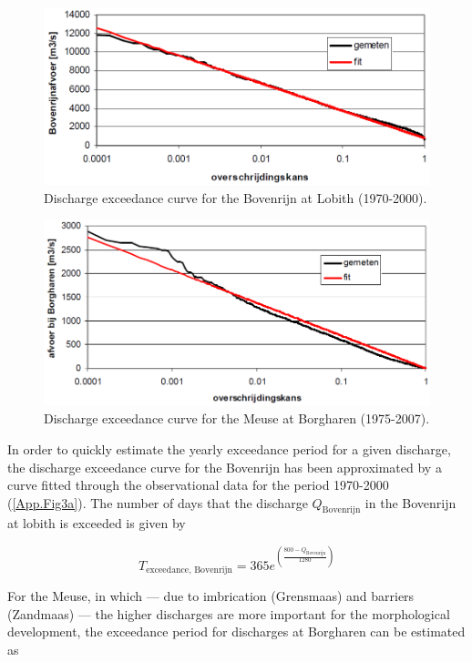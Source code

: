 \begin{figure}
\includegraphics[width=\columnwidth]{figures/Fig3a.png}
\caption{Discharge exceedance curve for the Bovenrijn at Lobith (1970-2000).}
\label{App.Fig3a}
\end{figure}

\begin{figure}
\includegraphics[width=\columnwidth]{figures/Fig3b.png}
\caption{Discharge exceedance curve for the Meuse at Borgharen (1975-2007).}
\label{App.Fig3b}
\end{figure}

In order to quickly estimate the yearly exceedance period for a given discharge, the discharge exceedance curve for the Bovenrijn has been approximated by a curve fitted through the observational data for the period 1970-2000 (\autoref{App.Fig3a}).
The number of days that the discharge $Q_\text{Bovenrijn}$ in the Bovenrijn at lobith is exceeded is given by

\begin{equation}
\label{Eq1a}
T_\text{exceedance, Bovenrijn} = 365 e^{\left ( \frac{800 -  Q_\text{Bovenrijn}}{1280} \right )}
\end{equation}

For the Meuse, in which --- due to imbrication (Grensmaas) and barriers (Zandmaas) --- the higher discharges are more important for the morphological development, the exceedance period for discharges at Borgharen can be estimated as

